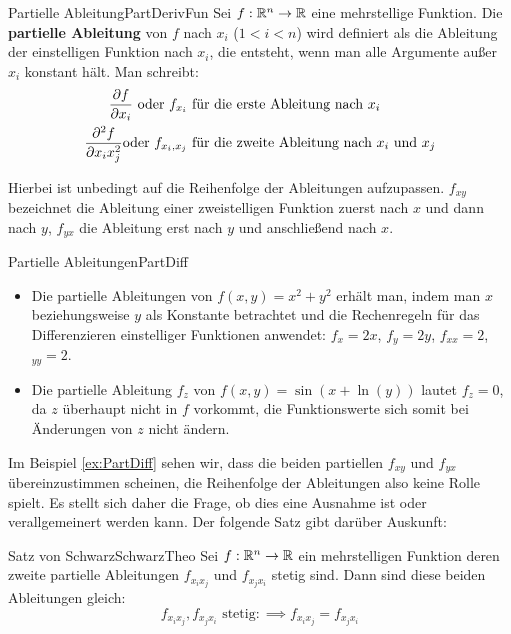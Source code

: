 \begin{definition}{Partielle Ableitung}{PartDerivFun}
    Sei $f: \mathbb{R}^n\to\mathbb{R}$ eine mehrstellige Funktion. Die \textbf{partielle Ableitung} von $f$ nach $x_i$ ($1<i<n$) wird definiert als die Ableitung der einstelligen Funktion nach $x_i$, die entsteht, wenn man alle Argumente außer $x_i$ konstant hält. Man schreibt:
    \begin{alignat*}{1}
        \frac{\partial f}{\partial x_i} \text { oder } f_{x_i} & \text{ für die erste Ableitung nach } x_i \\
        \frac{\partial^{2} f}{\partial x_i x_j^{2}} \text {oder } f_{x_i,x_j} & \text{ für die zweite Ableitung nach } x_i \text{ und } x_j
    \end{alignat*}
\end{definition}

Hierbei ist unbedingt auf die Reihenfolge der Ableitungen aufzupassen. $f_{xy}$ bezeichnet die Ableitung einer zweistelligen Funktion zuerst nach $x$ und dann nach $y$, $f_{yx}$ die Ableitung erst nach $y$ und anschließend nach $x$.

\begin{example}{Partielle Ableitungen}{PartDiff}
    \begin{itemize}
        \item Die partielle Ableitungen von $f(x,y) = x^2+y^2$ erhält man, indem man $x$ beziehungsweise $y$ als Konstante betrachtet und die Rechenregeln für das Differenzieren einstelliger Funktionen anwendet: $f_x = 2x$, $f_y = 2y$, $f_{xx} = 2$, $_{yy} = 2$.
        \item Die partielle Ableitung $f_z$ von $f(x,y) = \sin(x+\ln(y))$ lautet $f_z = 0$, da $z$ überhaupt nicht in $f$ vorkommt, die Funktionswerte sich somit bei Änderungen von $z$ nicht ändern.
    \end{itemize}
\end{example}

Im Beispiel \ref{ex:PartDiff} sehen wir, dass die beiden partiellen $f_{xy}$ und $f_{yx}$ übereinzustimmen scheinen, die Reihenfolge der Ableitungen also keine Rolle spielt. Es stellt sich daher die Frage, ob dies eine Ausnahme ist oder verallgemeinert werden kann. Der folgende Satz gibt darüber Auskunft:

\begin{statement}{Satz von Schwarz}{SchwarzTheo}
    Sei $f: \mathbb{R}^n \to \mathbb{R}$ ein mehrstelligen Funktion deren zweite partielle Ableitungen $f_{x_i x_j}$ und $f_{x_j x_i}$ stetig sind. Dann sind diese beiden Ableitungen gleich:
    $$
      f_{x_i x_j}, f_{x_j x_i} \text{ stetig}: \implies f_{x_i x_j} = f_{x_j x_i}
    $$
\end{statement}

